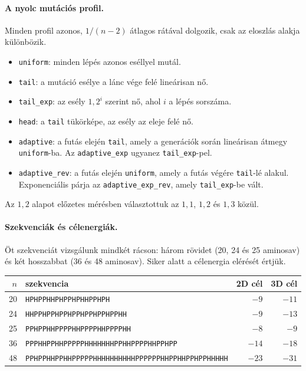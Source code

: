 \documentclass[11pt,a4paper]{article}
\begin{document}
\paragraph{A nyolc mutációs profil.} Minden profil azonos, $1/(n-2)$ átlagos
rátával dolgozik, csak az eloszlás alakja különbözik.
\begin{itemize}
\item \texttt{uniform}: minden lépés azonos eséllyel mutál.
\item \texttt{tail}: a mutáció esélye a lánc vége felé lineárisan nő.
\item \texttt{tail\_exp}: az esély $1{,}2^i$ szerint nő, ahol $i$ a lépés sorszáma.
\item \texttt{head}: a \texttt{tail} tükörképe, az esély az eleje felé nő.
\item \texttt{adaptive}: a futás elején \texttt{tail}, amely a generációk során
lineárisan átmegy \texttt{uniform}-ba. Az \texttt{adaptive\_exp} ugyanez
\texttt{tail\_exp}-pel.
\item \texttt{adaptive\_rev}: a futás elején \texttt{uniform}, amely a futás
végére \texttt{tail}-lé alakul. Exponenciális párja az
\texttt{adaptive\_exp\_rev}, amely \texttt{tail\_exp}-be vált.
\end{itemize}
Az $1{,}2$ alapot előzetes mérésben választottuk az $1{,}1$, $1{,}2$ és $1{,}3$
közül.

\paragraph{Szekvenciák és célenergiák.} Öt szekvenciát vizsgálunk mindkét
rácson: három rövidet (20, 24 és 25 aminosav) és két hosszabbat (36 és 48
aminosav). Siker alatt a célenergia elérését értjük.

\begin{center}
\footnotesize
\begin{tabular}{rlrr}
\toprule
$n$ & szekvencia & 2D cél & 3D cél \\
\midrule
20 & \texttt{HPHPPHHPHPPHPHHPPHPH} & $-9$ & $-11$ \\
24 & \texttt{HHPPHPPHPPHPPHPPHPPHPPHH} & $-9$ & $-13$ \\
25 & \texttt{PPHPPHHPPPPHHPPPPHHPPPPHH} & $-8$ & $-9$ \\
36 & \texttt{PPPHHPPHHPPPPPHHHHHHHPPHHPPPPHHPPHPP} & $-14$ & $-18$ \\
48 & \texttt{PPHPPHHPPHHPPPPPHHHHHHHHHHPPPPPPHHPPHHPPHPPHHHHH} & $-23$ & $-31$ \\
\bottomrule
\end{tabular}
\end{center}
\end{document}
